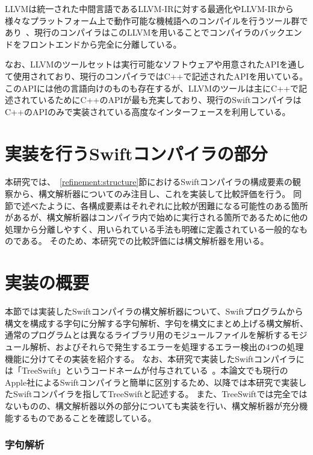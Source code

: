 LLVMは統一された中間言語であるLLVM-IRに対する最適化やLLVM-IRから様々なプラットフォーム上で動作可能な機械語へのコンパイルを行うツール群であり~\cite{llvm}、現行のコンパイラはこのLLVMを用いることでコンパイラのバックエンドをフロントエンドから完全に分離している。

なお、LLVMのツールセットは実行可能なソフトウェアや用意されたAPIを通して使用されており、現行のコンパイラではC++で記述されたAPIを用いている。
このAPIには他の言語向けのものも存在するが、LLVMのツールは主にC++で記述されているためにC++のAPIが最も充実しており、現行のSwiftコンパイラはC++のAPIのみで実装されている高度なインターフェースを利用している。

\section{実装を行うSwiftコンパイラの部分}
\label{implementation:part}

本研究では、~\ref{refinement:structure}節におけるSwiftコンパイラの構成要素の観察から、構文解析器についてのみ注目し、これを実装して比較評価を行う。
同節で述べたように、各構成要素はそれぞれに比較が困難になる可能性のある箇所があるが、構文解析器はコンパイラ内で始めに実行される箇所であるために他の処理から分離しやすく、用いられている手法も明確に定義されている一般的なものである。
そのため、本研究での比較評価には構文解析器を用いる。

\section{実装の概要}
\label{implementation:abstract}

本節では実装したSwiftコンパイラの構文解析器について、Swiftプログラムから構文を構成する字句に分解する字句解析、字句を構文にまとめ上げる構文解析、通常のプログラムとは異なるライブラリ用のモジュールファイルを解析するモジュール解析、およびそれらで発生するエラーを処理するエラー検出の4つの処理機能に分けてその実装を紹介する。
なお、本研究で実装したSwiftコンパイラには「TreeSwift」というコードネームが付与されている~\cite{treeswift}。本論文でも現行のApple社によるSwiftコンパイラと簡単に区別するため、以降では本研究で実装したSwiftコンパイラを指してTreeSwiftと記述する。
また、TreeSwiftでは完全ではないものの、構文解析器以外の部分についても実装を行い、構文解析器が充分機能するものであることを確認している。

\subsubsection{字句解析}

